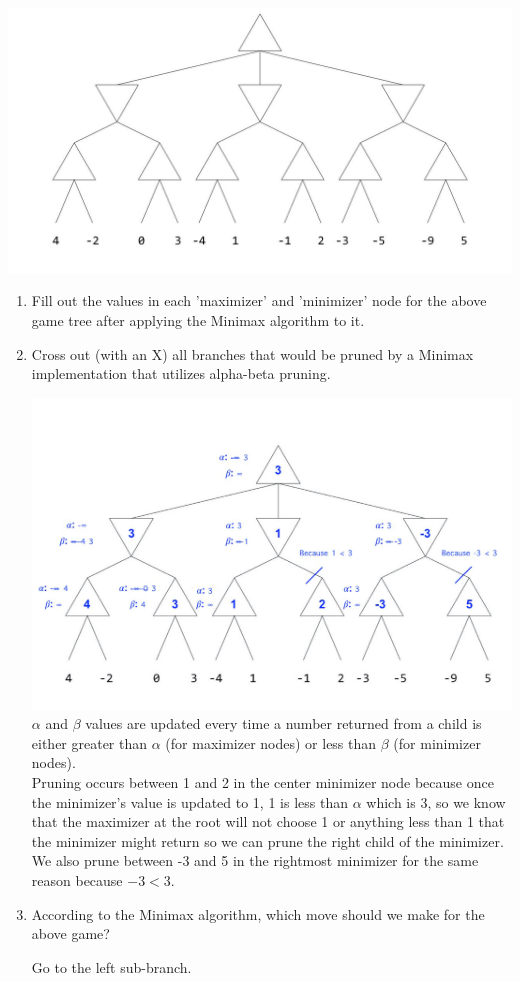 \begin{center}

\includegraphics[scale=0.35]{topics/trees/game-trees/empty-alpha-beta.jpg}
\end{center}
\begin{enumerate}
\item Fill out the values in each ’maximizer’ and ’minimizer’ node for the above game tree after applying the Minimax algorithm to it.
\item Cross out (with an X) all branches that would be pruned by a Minimax implementation that utilizes alpha-beta pruning.
\ifprintanswers
\begin{solution}[2in]
\includegraphics[scale=0.35]{topics/trees/game-trees/filled-alpha-beta.jpg}
$\alpha$ and $\beta$ values are updated every time a number returned from a child is either greater than $\alpha$ (for maximizer nodes) or less than $\beta$ (for minimizer nodes). \\
Pruning occurs between 1 and 2 in the center minimizer node because once the minimizer's value is updated to 1, 1 is less than $\alpha$ which is 3, so we know that the maximizer at the root will not choose 1 or anything less than 1 that the minimizer might return so we can prune the right child of the minimizer. We also prune between -3 and 5 in the rightmost minimizer for the same reason because $-3 < 3$.\\
\end{solution}
\fi
\item According to the Minimax algorithm, which move should we make for the above game?
\ifprintanswers
\begin{solution}[2in]
Go to the left sub-branch.
\end{solution}
\fi
\end{enumerate}